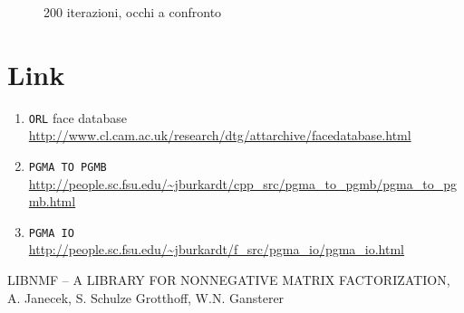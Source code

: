 \documentclass[a4paper]{article} %
\begin{document}
\begin{figure}
  \caption{200 iterazioni, occhi a confronto}
\end{figure}

\newpage
\section{Link}
\begin{enumerate}
\item \texttt{ORL} face database \\
  \url{http://www.cl.cam.ac.uk/research/dtg/attarchive/facedatabase.html}\label{itm:ORL}

\item \texttt{PGMA TO PGMB} \\
  \url{http://people.sc.fsu.edu/~jburkardt/cpp_src/pgma_to_pgmb/pgma_to_pgmb.html}\label{itm:A2B}

\item \texttt{PGMA IO} \\
  \url{http://people.sc.fsu.edu/~jburkardt/f_src/pgma_io/pgma_io.html}\label{itm:IO}

\end{enumerate}

LIBNMF – A LIBRARY FOR NONNEGATIVE MATRIX FACTORIZATION, \\
A. Janecek, S. Schulze Grotthoff, W.N. Gansterer\label{article}
\end{document}

